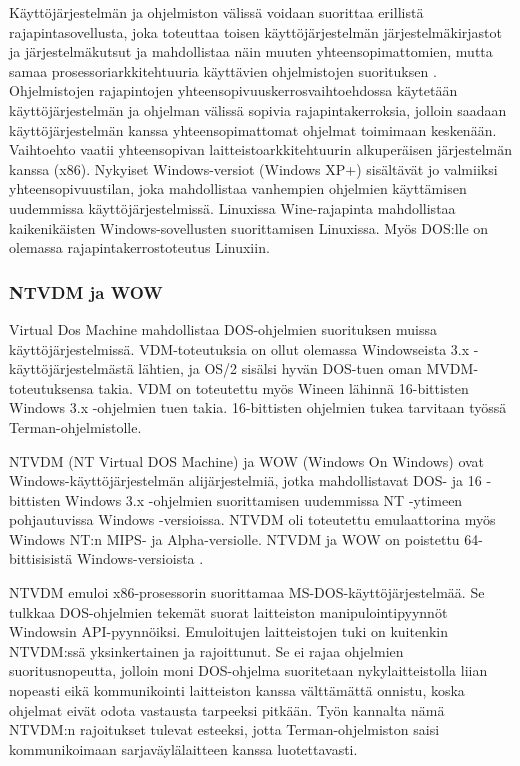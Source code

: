 


Käyttöjärjestelmän ja ohjelmiston välissä voidaan suorittaa erillistä rajapintasovellusta, joka toteuttaa toisen käyttöjärjestelmän järjestelmäkirjastot ja järjestelmäkutsut ja mahdollistaa näin muuten yhteensopimattomien, mutta samaa prosessoriarkkitehtuuria käyttävien ohjelmistojen suorituksen \cite{ntvdm_kb}. Ohjelmistojen rajapintojen yhteensopivuuskerrosvaihtoehdossa käytetään käyttöjärjestelmän ja ohjelman välissä sopivia rajapintakerroksia, jolloin saadaan käyttöjärjestelmän kanssa yhteensopimattomat ohjelmat toimimaan keskenään. Vaihtoehto vaatii yhteensopivan laitteistoarkkitehtuurin alkuperäisen järjestelmän kanssa (x86). Nykyiset Windows-versiot (Windows XP+) sisältävät jo valmiiksi yhteensopivuustilan, joka mahdollistaa vanhempien ohjelmien käyttämisen uudemmissa käyttöjärjestelmissä. Linuxissa Wine-rajapinta mahdollistaa kaikenikäisten Windows-sovellusten suorittamisen Linuxissa. Myös DOS:lle on olemassa rajapintakerrostoteutus Linuxiin.

\subsubsection{NTVDM ja WOW}

Virtual Dos Machine mahdollistaa DOS-ohjelmien suorituksen muissa käyttöjärjestelmissä. VDM-toteutuksia on ollut olemassa Windowseista 3.x -käyttöjärjestelmästä lähtien, ja OS/2 sisälsi hyvän DOS-tuen oman MVDM-toteutuksensa takia. VDM on toteutettu myös Wineen lähinnä 16-bittisten Windows 3.x -ohjelmien tuen takia. 16-bittisten ohjelmien tukea tarvitaan työssä Terman-ohjelmistolle.

NTVDM (NT Virtual DOS Machine) ja WOW (Windows On Windows) ovat Windows-käyttöjärjestelmän alijärjestelmiä, jotka mahdollistavat DOS- ja 16 -bittisten Windows 3.x -ohjelmien suorittamisen uudemmissa NT -ytimeen pohjautuvissa Windows -versioissa. NTVDM oli toteutettu emulaattorina myös Windows NT:n MIPS- ja Alpha-versiolle. NTVDM ja WOW on poistettu 64-bittisisistä Windows-versioista \cite{ntvdm_2}.

NTVDM emuloi x86-prosessorin suorittamaa MS-DOS-käyttöjärjestelmää. Se tulkkaa DOS-ohjelmien tekemät suorat laitteiston manipulointipyynnöt Windowsin API-pyynnöiksi. Emuloitujen laitteistojen tuki on kuitenkin NTVDM:ssä yksinkertainen ja rajoittunut. Se ei rajaa ohjelmien suoritusnopeutta, jolloin moni DOS-ohjelma suoritetaan nykylaitteistolla liian nopeasti eikä kommunikointi laitteiston kanssa välttämättä onnistu, koska ohjelmat eivät odota vastausta tarpeeksi pitkään. Työn kannalta nämä NTVDM:n rajoitukset tulevat esteeksi, jotta Terman-ohjelmiston saisi kommunikoimaan sarjaväylälaitteen kanssa luotettavasti.

